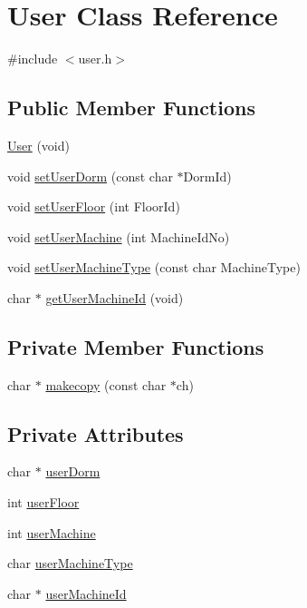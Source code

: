 \hypertarget{classUser}{}\section{User Class Reference}
\label{classUser}


{\ttfamily \#include $<$user.\+h$>$}

\subsection*{Public Member Functions}
\begin{DoxyCompactItemize}
\item 
\hyperlink{classUser_a9a728dad6620c050f615b73f7bca5cb1}{User} (void)
\item 
void \hyperlink{classUser_a403db79f8c867abdf97b439d4dae11d0}{set\+User\+Dorm} (const char $\ast$Dorm\+Id)
\item 
void \hyperlink{classUser_aad56ed72b7df97e4502f45d4ac667126}{set\+User\+Floor} (int Floor\+Id)
\item 
void \hyperlink{classUser_a8462db103584dd74534bc663ff5f2097}{set\+User\+Machine} (int Machine\+Id\+No)
\item 
void \hyperlink{classUser_afb5acdb16bedc32ed78ae316d45af04e}{set\+User\+Machine\+Type} (const char Machine\+Type)
\item 
char $\ast$ \hyperlink{classUser_a74d5df47df160b5ae9c1dd1e3f338298}{get\+User\+Machine\+Id} (void)
\end{DoxyCompactItemize}
\subsection*{Private Member Functions}
\begin{DoxyCompactItemize}
\item 
char $\ast$ \hyperlink{classUser_a6d5b4a38c0a16c7944f725df302931b1}{makecopy} (const char $\ast$ch)
\end{DoxyCompactItemize}
\subsection*{Private Attributes}
\begin{DoxyCompactItemize}
\item 
char $\ast$ \hyperlink{classUser_ae0517de4807d5f9a449e8a4c4341f4c9}{user\+Dorm}
\item 
int \hyperlink{classUser_a0c86cd357c87600cf0f6ebbc066785c2}{user\+Floor}
\item 
int \hyperlink{classUser_aea80da016298be436439c1998c603f8d}{user\+Machine}
\item 
char \hyperlink{classUser_af019bb7663447d96e7c4f8b8920b8eb1}{user\+Machine\+Type}
\item 
char $\ast$ \hyperlink{classUser_a38faf399c2812eb80dafc6975843ae08}{user\+Machine\+Id}
\end{DoxyCompactItemize}


